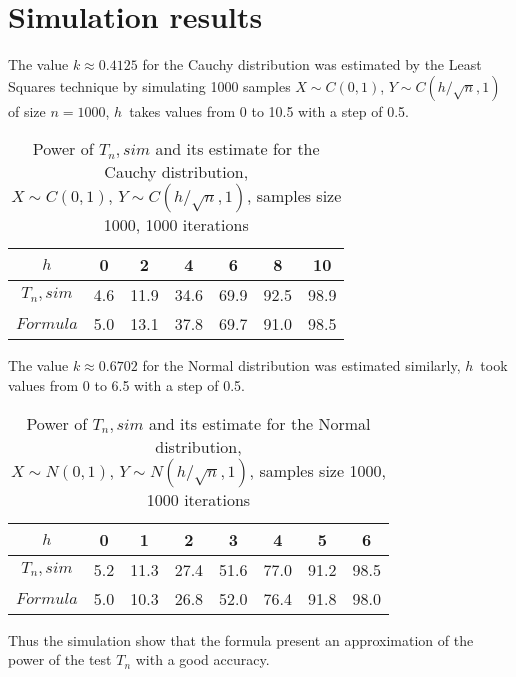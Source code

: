\documentclass[slidestop,usepdftitle=false]{beamer}
\begin{document}
\section{Simulation results}

 \begin{slide}
 
 The value $k\approx 0.4125$ for the Cauchy distribution was estimated by the Least Squares technique by simulating 1000 samples $X\sim C(0,1)$, $Y\sim C(h/\sqrt{n},1)$ of size $n=1000$, $h$~takes values from 0 to 10.5 with a step of 0.5.
 
 \begin{longtable}{|c|c|c|c|c|c|c|}
  \caption{Power of $T_n, sim$ and its estimate for the Cauchy distribution, \\
           $X\sim C(0,1)$, $Y\sim C(h/\sqrt{n},1)$, samples size 1000, 1000 iterations} \\
  \hline
   $h$ & 0 & 2 & 4 & 6 & 8 & 10 \\ \hline
   $T_n, sim$ & 4.6 & 11.9 & 34.6 & 69.9 & 92.5 & 98.9 \\ %
   $Formula$ & 5.0 & 13.1 & 37.8 & 69.7 & 91.0 & 98.5 \\ \hline
 \end{longtable}
 
 \end {slide}
 
 \begin{slide}
 
 The value $k\approx 0.6702$ for the Normal distribution was estimated similarly, $h$~took values from 0 to 6.5 with a step of 0.5.
 
 \vspace{0.5cm}
 
 \begin{longtable}{|c|c|c|c|c|c|c|c|}
  \caption{Power of $T_n, sim$ and its estimate for the Normal distribution, \\
           $X\sim N(0,1)$, $Y\sim N(h/\sqrt{n},1)$, samples size 1000, 1000 iterations} \\
  \hline
   $h$ & 0 & 1 & 2 & 3 & 4 & 5 & 6 \\ \hline
   $T_n, sim$ & 5.2 & 11.3 & 27.4 & 51.6 & 77.0 & 91.2 & 98.5 \\ %
   $Formula$ & 5.0 & 10.3 & 26.8 & 52.0 & 76.4 & 91.8 & 98.0 \\ \hline
 \end{longtable}
 \bigskip
Thus the simulation show that the formula present an approximation of the power of the test $T_n$ with a good accuracy. 
 \end {slide}
\end{document}
